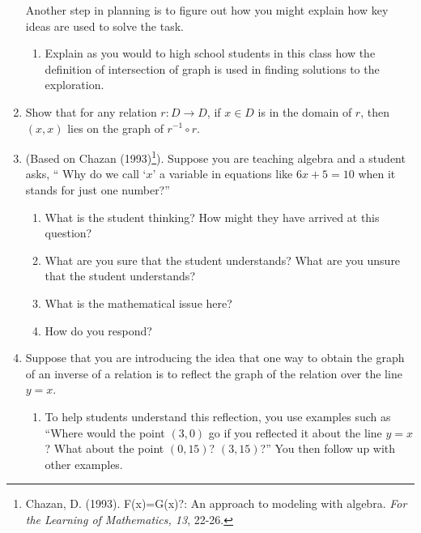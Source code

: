 \documentclass[11pt]{article}
\theoremstyle{definition}
\begin{document}
\begin{enumerate}[resume]
Another step in planning is to figure out how you might explain how key ideas are used to solve the task.
	\begin{enumerate}[resume]
	\item Explain as you would to high school students in this class how the definition of intersection of graph is used in finding solutions to the exploration.
	\end{enumerate}
	
\item 
Show that for any relation $r:D\to D$, if $x\in D$ is in the domain of $r$, then $(x,x)$ lies on the graph of $r^{-1}\circ r$. 

\item 
(Based on Chazan (1993)\footnote{Chazan, D. (1993). F(x)=G(x)?: An approach to modeling with algebra. {\it For the Learning of Mathematics, 13}, 22-26.}). Suppose you are teaching algebra and a student asks, ``
Why do we call `$x$' a variable in equations like $6x+5 = 10$ when it stands for just one
number?'' 

	\begin{enumerate}
	\item What is the student thinking? How might they have arrived at this question?
	\item What are you sure that the student understands? What are you unsure that the student understands?
	\item What is the mathematical issue here?
	\item How do you respond?
	\end{enumerate}
	
\item 
\label{h: reflect over y=x}
Suppose that you are introducing the idea that one way to obtain the graph of an inverse of a relation is to reflect the graph of the relation over the line $y=x$. 
	\begin{enumerate}
	\item To help students understand this reflection, you use examples such as ``Where would the point $(3,0)$ go if you reflected it about the line $y=x$? What about the point $(0, 15)$? $(3,15)$?'' 	You then follow up with other examples.
	 

\end{enumerate}
\end{enumerate}
\end{document}
